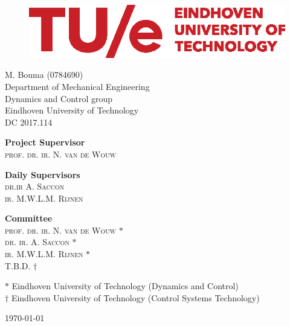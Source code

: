 \documentclass[DC2017114Bouma.tex]{subfiles}
\begin{document}
\begin{figure}[H]
\centering
\begin{minipage}{.495\textwidth}
  \includegraphics[width=0.9\linewidth]{TUe-logo-descriptor-line-scarlet-rgb.eps}
\end{minipage}
\end{figure}  

\begin{center}

\vspace*{80pt}
\huge{\textbf{\mytitle}}

\vspace*{30pt}
{\Large M. Bouma (0784690)}\\
\large{Department of Mechanical Engineering\\
			Dynamics and Control group\\
			Eindhoven University of Technology}\\
{\large DC 2017.114}

\end{center}

\vspace{3cm}

\begin{flushleft} 
	\textbf{Project Supervisor}\\
	\textsc{prof. dr. ir. N. van de Wouw}
\end{flushleft}
\vspace{.1cm}
\begin{flushleft} 
	\textbf{Daily Supervisors}\\
	\textsc{dr.ir A. Saccon}\\
	\textsc{ir. M.W.L.M. Rijnen}
\end{flushleft}
\vspace{.1cm}
\begin{flushleft} 
	\textbf{Committee}\\
	\textsc{prof. dr. ir. N. van de Wouw} $*$\\
	\textsc{dr. ir. A. Saccon} $*$\\
	\textsc{ir. M.W.L.M. Rijnen} $*$\\
	\textsc{T.B.D.} $\dagger$
\end{flushleft}
\vfill
{\small $*$ Eindhoven University of Technology (Dynamics and Control)}\\
{\small $\dagger$ Eindhoven University of Technology (Control Systems Technology)}
\bigskip

\today
\end{document}
